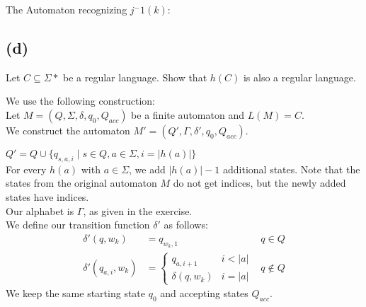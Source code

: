 The Automaton recognizing $j^-1(k)$: \\


\subsection{(d)}

Let $C \subseteq \Sigma *$ be a regular language. Show that $h(C)$ is also a regular language.

We use the following construction:\\
Let $M=(Q,\Sigma,\delta,q_{0},Q_{acc})$ be a finite automaton and $L(M)=C$.\\
We construct the automaton $M'=(Q',\Gamma,\delta', q_{0}, Q_{acc})$.

$Q'=Q\cup \{ q_{s,a,i}\mid s\in Q, a \in \Sigma, i = \lvert h(a) \rvert \} $\\
For every $h(a)$ with $a \in \Sigma$, we add $\lvert h(a)\rvert -1$ additional states. Note that the states from the original automaton $M$ do not get indices, but the newly added states have indices.\\
Our alphabet is $\Gamma$, as given in the exercise.\\
We define our transition function $\delta'$ as follows:\\
\begin{align*}
\delta' (q, w_{k}) &= q_{w_{k},1} &q\in Q\\
\delta' (q_{a,i}, w_{k}) &= 
\begin{cases}
    q_{a,i+1} &i < \lvert a \rvert\\
    \delta(q, w_{k})&i=\lvert a \rvert
\end{cases}
&q\notin Q
\end{align*}
We keep the same starting state $q_{0}$ and accepting states $Q_{acc}$.




